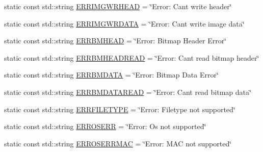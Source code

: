 \begin{DoxyCompactItemize}
\item 
static const std\+::string \mbox{\hyperlink{classErrorHandler_aaacdfc33d32a1f97a8a2704512fa4436}{E\+R\+R\+I\+M\+G\+W\+R\+H\+E\+AD}} = \char`\"{}Error\+: Can\textquotesingle{}t write header\char`\"{}
\item 
static const std\+::string \mbox{\hyperlink{classErrorHandler_afc2c1377f8cee14dac495c98323b02f1}{E\+R\+R\+I\+M\+G\+W\+R\+D\+A\+TA}} = \char`\"{}Error\+: Can\textquotesingle{}t write image data\char`\"{}
\item 
static const std\+::string \mbox{\hyperlink{classErrorHandler_ace09849c636b0d6692e5437dfd3fb099}{E\+R\+R\+B\+M\+H\+E\+AD}} = \char`\"{}Error\+: Bitmap Header Error\char`\"{}
\item 
static const std\+::string \mbox{\hyperlink{classErrorHandler_ad44dda4b409046f04853a02d460be932}{E\+R\+R\+B\+M\+H\+E\+A\+D\+R\+E\+AD}} = \char`\"{}Error\+: Can\textquotesingle{}t read bitmap header\char`\"{}
\item 
static const std\+::string \mbox{\hyperlink{classErrorHandler_a8aa9a03085699f122048543d17a74796}{E\+R\+R\+B\+M\+D\+A\+TA}} = \char`\"{}Error\+: Bitmap Data Error\char`\"{}
\item 
static const std\+::string \mbox{\hyperlink{classErrorHandler_a0cc80205269faf8ab6a2898627d1d078}{E\+R\+R\+B\+M\+D\+A\+T\+A\+R\+E\+AD}} = \char`\"{}Error\+: Can\textquotesingle{}t read bitmap data\char`\"{}
\item 
static const std\+::string \mbox{\hyperlink{classErrorHandler_abc06f91cc00179b2993cb558770c4d80}{E\+R\+R\+F\+I\+L\+E\+T\+Y\+PE}} = \char`\"{}Error\+: Filetype not supported\char`\"{}
\item 
static const std\+::string \mbox{\hyperlink{classErrorHandler_addc0430f69f200c95ae36b23cd0d10a6}{E\+R\+R\+O\+S\+E\+RR}} = \char`\"{}Error\+: Os not supported\char`\"{}
\item 
static const std\+::string \mbox{\hyperlink{classErrorHandler_a05fc7c7e84ed87c3d91eeb5336a042e3}{E\+R\+R\+O\+S\+E\+R\+R\+M\+AC}} = \char`\"{}Error\+: M\+AC not supported\char`\"{}
\end{DoxyCompactItemize}
